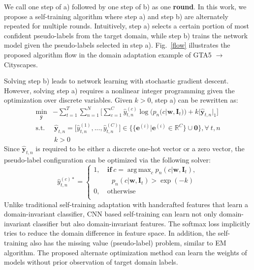 \documentclass[runningheads]{llncs}
\DeclareMathOperator*{\argmax}{arg\,max}
\begin{document}
We call one step of a) followed by one step of b) as one \textbf{round}. In this work, we propose a self-training algorithm where step a) and step b) are alternately repeated for multiple rounds. Intuitively, step a) selects a certain portion of most confident pseudo-labels from the target domain, while step b) trains the network model given the pseudo-labels selected in step a). Fig.~\ref{flow} illustrates the proposed algorithm flow in the domain adaptation example of GTA5 $\rightarrow$ Cityscapes.

Solving step b) leads to network learning with stochastic gradient descent. However, solving step a) requires a nonlinear integer programming given the optimization over discrete variables. Given $k>0$, step a) can be rewritten as:
\begin{equation}\label{st_a}
\begin{split}
\min_{\hat{\mathbf{y}}}& -\sum_{t=1}^{T}\sum_{n=1}^{N}\Big[\sum_{c=1}^C\hat{y}_{t,n}^{(c)}\log (p_n(c|\mathbf{w},\mathbf{I}_t))+k|\hat{\mathbf{y}}_{t,n}|_1\Big]\\
\mathrm{s.t.}& ~\hat{\mathbf{y}}_{t,n}=\big[\hat{y}_{t,n}^{(1)},...,\hat{y}_{t,n}^{(C)}\big] \in \{\{\mathbf{e}^{(i)}|\mathbf{e}^{(i)} \in \mathbb{R}^C\} \cup \mathbf{0}\}, \forall~t,n\\
&~k>0
\end{split}
\end{equation}
Since $\hat{\mathbf{y}}_{t,n}$ is required to be either a discrete one-hot vector or a zero vector, the pseudo-label configuration can be optimized via the following solver:
\begin{equation}\label{st_solver}
\hat{y}_{t,n}^{(c)*}=\left\{
\begin{aligned}
1, &~\mathbf{if}~c=\argmax_{c}p_n(c|\mathbf{w},\mathbf{I}_t),\\ &~~~~p_n(c|\mathbf{w},\mathbf{I}_t)>\exp(-k)\\
0, &~\mathrm{otherwise}\\
\end{aligned}
\right.
\end{equation}
Unlike traditional self-training adaptation with handcrafted features that learn a domain-invariant classifier, CNN based self-training can learn not only domain-invariant classifier but also domain-invariant features. The softmax loss implicitly tries to reduce the domain difference in feature space. In addition, the self-training also has the missing value (pseudo-label) problem, similar to EM algorithm. The proposed alternate optimization method can learn the weights of models without prior observation of target domain labels.
\end{document}
